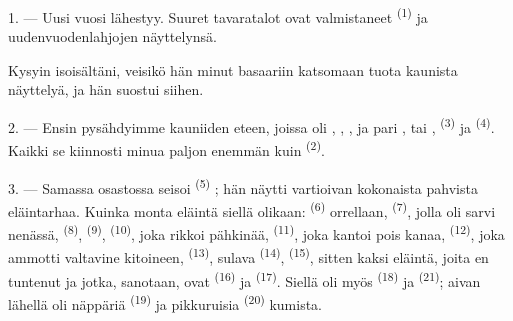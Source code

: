 %
%

\VUsaut{4.0mm}
\VUsaut{2.0mm}
\VUsaut{3.4mm}

1. --- Uusi vuosi lähestyy. Suuret tavaratalot ovat valmistaneet 
\textsuperscript{(1)} ja uudenvuodenlahjojen näyttelynsä.

Kysyin isoisältäni, veisikö hän minut basaariin katsomaan tuota kaunista
näyttelyä, ja hän suostui siihen.

2. --- Ensin pysähdyimme kauniiden  eteen, joissa oli
, , ,  ja
pari , tai , 
\textsuperscript{(3)} ja  \textsuperscript{(4)}. Kaikki se
kiinnosti minua paljon enemmän kuin  \textsuperscript{(2)}.

\VUsaut{3.0mm}
\VUsaut{2.6mm}

3. --- Samassa osastossa seisoi  \textsuperscript{(5)}
; hän näytti vartioivan kokonaista pahvista
eläintarhaa. Kuinka monta eläintä siellä olikaan: 
\textsuperscript{(6)} orrellaan,  \textsuperscript{(7)},
jolla oli sarvi nenässä,  \textsuperscript{(8)},
 \textsuperscript{(9)},  \textsuperscript{(10)},
joka rikkoi pähkinää,  \textsuperscript{(11)}, joka kantoi pois
kanaa,  \textsuperscript{(12)}, joka ammotti valtavine
kitoineen,  \textsuperscript{(13)}, sulava
 \textsuperscript{(14)}, 
\textsuperscript{(15)}, sitten kaksi eläintä, joita en tuntenut ja jotka,
sanotaan, ovat  \textsuperscript{(16)} ja 
\textsuperscript{(17)}. Siellä oli myös 
\textsuperscript{(18)} ja  \textsuperscript{(21)}; aivan lähellä
oli näppäriä  \textsuperscript{(19)} ja pikkuruisia
 \textsuperscript{(20)} kumista.

